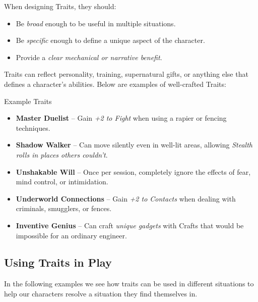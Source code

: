 When designing Traits, they should:
\begin{itemize}
    \item Be \emph{broad} enough to be useful in multiple situations.
    \item Be \emph{specific} enough to define a unique aspect of the character.
    \item Provide a \emph{clear mechanical or narrative benefit}.
\end{itemize}

Traits can reflect personality, training, supernatural gifts, or anything else that defines a character’s abilities. Below are examples of well-crafted Traits:

\begin{DndSidebar}[float=!t]{Example Traits}
    \begin{itemize}
        \item \textbf{Master Duelist} – Gain \emph{+2 to Fight} when using a rapier or fencing techniques.
        \item \textbf{Shadow Walker} – Can move silently even in well-lit areas, allowing \emph{Stealth rolls in places others couldn’t}.
        \item \textbf{Unshakable Will} – Once per session, completely ignore the effects of fear, mind control, or intimidation.
        \item \textbf{Underworld Connections} – Gain \emph{+2 to Contacts} when dealing with criminals, smugglers, or fences.
        \item \textbf{Inventive Genius} – Can craft \emph{unique gadgets} with Crafts that would be impossible for an ordinary engineer.
    \end{itemize}
\end{DndSidebar}

\subsection{Using Traits in Play}

In the following examples we see how traits can be used in different situations to help our characters resolve a situation they find themselves in.

